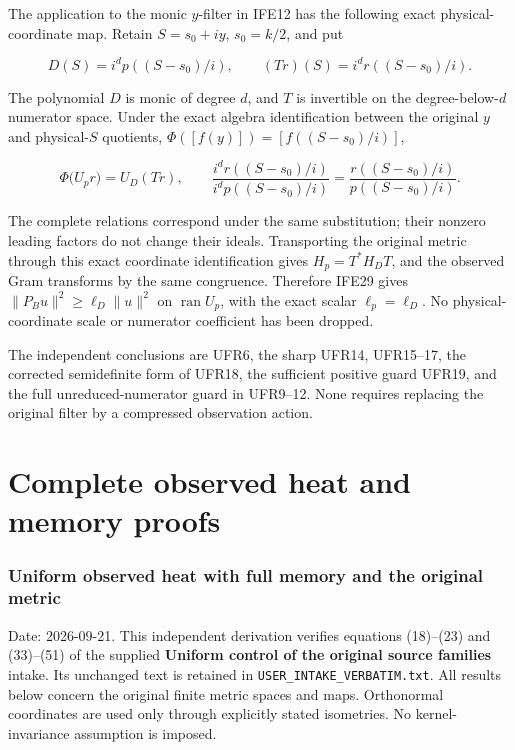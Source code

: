 \documentclass[11pt]{article}
\begin{document}
The application to the monic \(y\)-filter in IFE12 has the following exact physical-coordinate map. Retain \(S=s_0+iy\), \(s_0=k/2\), and put

\[
D(S)=i^d p((S-s_0)/i),\qquad
(Tr)(S)=i^d r((S-s_0)/i).
\tag{IFE30}
\]

The polynomial \(D\) is monic of degree \(d\), and \(T\) is invertible on the degree-below-\(d\) numerator space. Under the exact algebra identification between the original \(y\) and physical-\(S\) quotients, \(\Phi([f(y)])=[f((S-s_0)/i)]\),

\[
\Phi\bigl(U_pr\bigr)=U_D(Tr),
\qquad
\frac{i^d r((S-s_0)/i)}{i^d p((S-s_0)/i)}
=\frac{r((S-s_0)/i)}{p((S-s_0)/i)}.
\tag{IFE31}
\]

The complete relations correspond under the same substitution; their nonzero leading factors do not change their ideals. Transporting the original metric through this exact coordinate identification gives \(H_p=T^*H_DT\), and the observed Gram transforms by the same congruence. Therefore IFE29 gives \(\|P_Bu\|^2\ge\ell_D\|u\|^2\) on \(\operatorname{ran}U_p\), with the exact scalar \(\ell_p=\ell_D\). No physical-coordinate scale or numerator coefficient has been dropped.

The independent conclusions are UFR6, the sharp UFR14, UFR15--17, the corrected semidefinite form of UFR18, the sufficient positive guard UFR19, and the full unreduced-numerator guard in UFR9--12. None requires replacing the original filter by a compressed observation action.

\clearpage\part{Complete observed heat and memory proofs}
\section{Uniform observed heat with full memory and the original metric}\label{uniform-observed-heat-with-full-memory-and-the-original-metric}

Date: 2026-09-21. This independent derivation verifies equations (18)--(23) and (33)--(51) of the supplied \textbf{Uniform control of the original source families} intake. Its unchanged text is retained in \nolinkurl{USER_INTAKE_VERBATIM.txt}. All results below concern the original finite metric spaces and maps. Orthonormal coordinates are used only through explicitly stated isometries. No kernel-invariance assumption is imposed.
\end{document}
